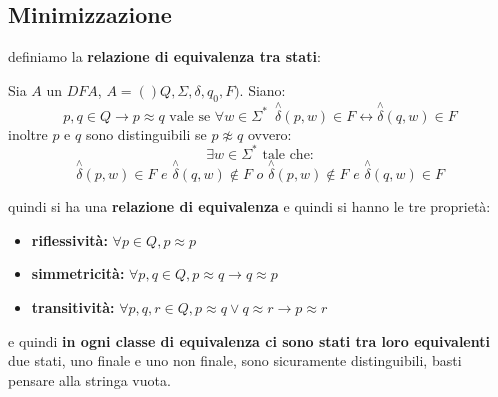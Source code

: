 \documentclass[a4paper,12pt, oneside]{book}
\begin{document}
\subsection{Minimizzazione}
definiamo la \textbf{relazione di equivalenza tra stati}:
\begin{definizione}
Sia $A$ un $DFA$, $A=()Q,\Sigma,\delta,q_0,F)$. Siano:
$$p,q\in Q\to p\approx q\mbox{ vale se } \forall w \in \Sigma^*\,\,\, \stackrel{\wedge}{\delta}(p,w)\in F\longleftrightarrow \stackrel{\wedge}{\delta}(q,w)\in F$$
inoltre $p$ e $q$ sono distinguibili se $p\not\approx q$ ovvero:
$$\exists w\in \Sigma^*\mbox{ tale che:} $$
$$\stackrel{\wedge}{\delta}(p,w)\in F \,\,e\,\,\stackrel{\wedge}{\delta}(q,w)\not\in F\,\,o\,\,\stackrel{\wedge}{\delta}(p,w)\not\in F \,\,e\,\,\stackrel{\wedge}{\delta}(q,w)\in F$$
\end{definizione}
quindi si ha una \textbf{relazione di equivalenza} e quindi si hanno le tre proprietà:
\begin{itemize}
\item \textbf{riflessività:} $\forall p\in Q, p\approx p$
\item \textbf{simmetricità:} $\forall p,q\in Q, p\approx q\to q\approx p$
\item \textbf{transitività:} $\forall p,q,r\in Q, p\approx q\vee q\approx r\to p\approx r$
\end{itemize} 
e quindi \textbf{in ogni classe di equivalenza ci sono stati tra loro equivalenti}
due stati, uno finale e uno non finale, sono sicuramente distinguibili, basti pensare alla stringa vuota.
\end{document}
